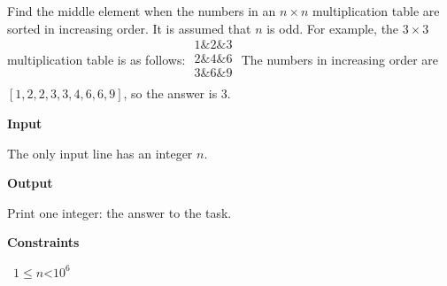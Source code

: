 Find the middle element when the numbers in an $n \times n$ multiplication table are sorted in increasing order. It is assumed that $n$ is odd.
For example, the $3 \times 3$ multiplication table is as follows:
$
\begin{matrix}
1 \& 2 \& 3 \\
2 \& 4 \& 6 \\
3 \& 6 \& 9 \\
\end{matrix}
$
The numbers in increasing order are $[1,2,2,3,3,4,6,6,9]$, so the answer is $3$.

\vspace{0.3cm}\noindent\textbf{Input}

The only input line has an integer $n$.

\vspace{0.3cm}\noindent\textbf{Output}

Print one integer: the answer to the task.

\vspace{0.3cm}\noindent\textbf{Constraints}

\textbullet\ $1 \le n $<$ 10^6$